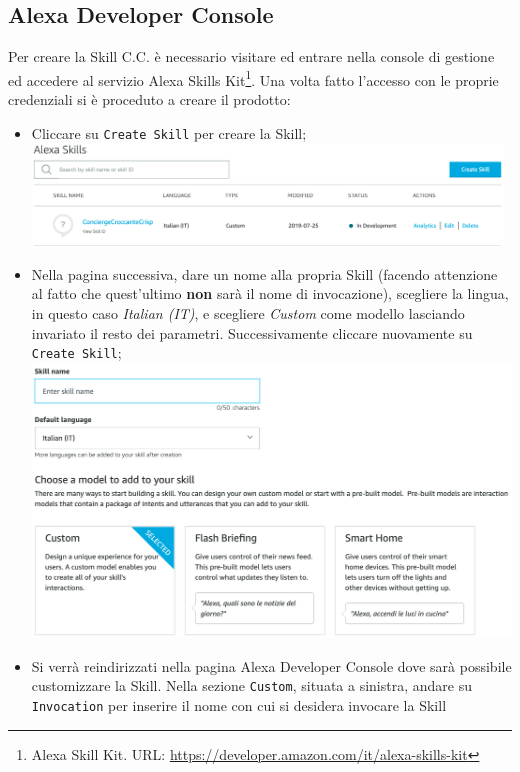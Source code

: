 \subsection{Alexa Developer Console}
Per creare la Skill C.C. è necessario visitare ed entrare nella console di gestione ed accedere al servizio Alexa Skills Kit\footnote{Alexa Skill Kit. URL: \href{https://developer.amazon.com/it/alexa-skills-kit}{https://developer.amazon.com/it/alexa-skills-kit}}. Una volta fatto l’accesso con le proprie credenziali si è proceduto a creare il prodotto:
\begin{itemize}
	\item Cliccare su \texttt{Create Skill} per creare la Skill;\\
	\includegraphics[width=12.5cm]{immagini/alexa-console-dev1.png}
	\item Nella pagina successiva, dare un nome alla propria Skill (facendo attenzione al fatto che quest'ultimo \textbf{non} sarà il nome di invocazione), scegliere la lingua, in questo caso \textit{Italian (IT)}, e scegliere \textit{Custom} come modello lasciando invariato il resto dei parametri. Successivamente cliccare nuovamente su \texttt{Create Skill};\\
	\includegraphics[width=13cm]{immagini/alexa-console-dev2.png}\\
	\newpage
	\item Si verrà reindirizzati nella pagina Alexa Developer Console dove sarà possibile customizzare la Skill. Nella sezione \texttt{Custom}, situata a sinistra, andare su \texttt{Invocation} per inserire il nome con cui si desidera invocare la Skill\\[0.5cm]

\end{itemize}
